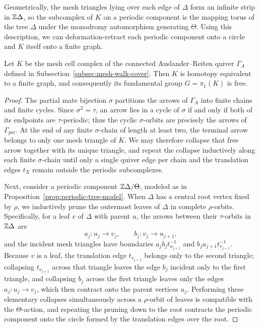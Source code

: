 Geometrically, the mesh triangles lying over each edge of $\Delta$ form an
infinite strip in $\mathbb Z\Delta$, so the subcomplex of $K$ on a periodic
component is the mapping torus of the tree $\Delta$ under the monodromy
automorphism generating $\Theta$. Using this description, we can deformation-retract
each periodic component onto a circle and $K$ itself onto a finite graph.

\begin{lemma}
\label{lem:mesh-walk-free}
Let $K$ be the mesh cell complex of the connected Auslander--Reiten quiver
$\Gamma_A$ defined in Subsection~\ref{subsec:mesh-walk-cover}. Then $K$ is
homotopy equivalent to a finite graph, and consequently its fundamental
group $G=\pi_1(K)$ is free.
\end{lemma}
\begin{proof}
The partial mate bijection $\sigma$ partitions the arrows of $\Gamma_A$ into
finite chains and finite cycles. Since $\sigma^2=\tau$, an arrow lies in a
cycle of $\sigma$ if and only if both of its endpoints are $\tau$-periodic;
thus the cyclic $\sigma$-orbits are precisely the arrows of
$\Gamma_{\mathrm{per}}$. At the end of any finite $\sigma$-chain of length at
least two, the terminal arrow belongs to only one mesh triangle of $K$. We
may therefore collapse that free arrow together with its unique triangle, and
repeat the collapse inductively along each finite $\sigma$-chain until only a
single quiver edge per chain and the translation edges $t_X$ remain outside
the periodic subcomplexes.

Next, consider a periodic component $\mathbb Z\Delta/\Theta$, modeled as in
Proposition~\ref{prop:periodic-tree-model}. When $\Delta$ has a central root
vertex fixed by $\rho$, we inductively prune the outermost leaves of $\Delta$
in complete $\rho$-orbits. Specifically, for a leaf $v$ of $\Delta$ with
parent $u$, the arrows between their $\tau$-orbits in $\mathbb Z\Delta$ are
\[
 a_j:u_j\longrightarrow v_j,\qquad
 b_j:v_j\longrightarrow u_{j+1},
\]
and the incident mesh triangles have boundaries
$a_jb_jt_{u_{j+1}}^{-1}$ and $b_ja_{j+1}t_{v_{j+1}}^{-1}$. Because $v$ is a
leaf, the translation edge $t_{v_{j+1}}$ belongs only to the second triangle;
collapsing $t_{v_{j+1}}$ across that triangle leaves the edge $b_j$ incident
only to the first triangle, and collapsing $b_j$ across the first triangle
leaves only the edges $a_j:u_j\to v_j$, which then contract onto the parent
vertices $u_j$. Performing these elementary collapses simultaneously across
a $\rho$-orbit of leaves is compatible with the $\Theta$-action, and
repeating the pruning down to the root contracts the periodic component onto
the circle formed by the translation edges over the root.


\end{proof}
